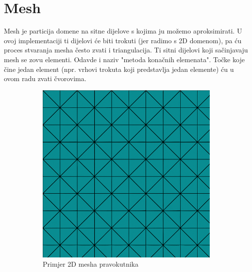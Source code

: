 \documentclass[zavrsnirad]{../fer}
\begin{document}
\section{Mesh}
\label{mesh}
Mesh je particija domene na sitne dijelove s kojima ju
možemo aproksimirati. U ovoj implementaciji ti dijelovi 
će biti trokuti (jer radimo s 2D domenom), pa ću proces
stvaranja mesha često zvati i triangulacija. Ti sitni 
dijelovi koji sačinjavaju mesh se zovu elementi. 
Odavde i naziv "metoda konačnih elemenata". Točke koje
čine jedan element (npr. vrhovi trokuta koji predstavlja
jedan elemente) ću u ovom radu zvati čvorovima.

\begin{figure}[htbp]
  \centering
  \begin{subfigure}[b]{0.45\linewidth}
    \centering
    \includegraphics[width=\linewidth]{Figures/2Dmesh.png}
    \caption{Primjer 2D mesha pravokutnika}
    \label{rectMesh}
  \end{subfigure}
  \hfill
  \begin{subfigure}[b]{0.45\linewidth}
    \centering

\end{subfigure}
\end{figure}
\end{document}
